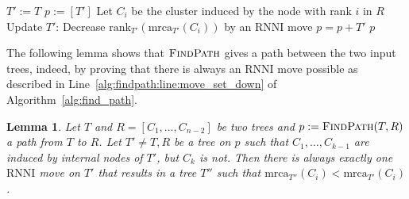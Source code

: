 \documentclass{amsart}
\newcommand{\mrca}{\mathrm{mrca}}
\newcommand{\rank}{\mathrm{rank}}
\newcommand{\rnni}{\mathrm{RNNI}}
\newcommand{\findpath}{\textsc{FindPath}}
\newtheorem{lemma}[definition]{Lemma}
\begin{document}
\begin{algorithm}[H]
\caption{$\findpath$($T,R$)}
\label{alg:find_path}
\begin{algorithmic}[1]
	\STATE $T' := T$
	\STATE $p := [T']$
		\STATE Let $C_i$ be the cluster induced by the node with rank $i$ in $R$ \label{alg:find_path:line:cluster}
		\WHILE {$\rank_{T'}(\mrca_{T'}(C_i))>i$}
			\STATE Update $T'$: Decrease $\rank_{T'}(\mrca_{T'}(C_i))$ by an $\rnni$ move \label{alg:findpath:line:move_set_down}
			\STATE $p = p+T'$
		\ENDWHILE
	\ENDFOR
	\RETURN $p$
\end{algorithmic}
\end{algorithm}

The following lemma shows that $\findpath$ gives a path between the two input trees, indeed, by proving that there is always an $\rnni$ move possible as described in Line~\ref{alg:findpath:line:move_set_down} of Algorithm~\ref{alg:find_path}.

\begin{lemma}
    Let $T$ and $R = [C_1, \ldots, C_{n-2}]$ be two trees and $p:= \findpath (T,R)$ a path from $T$ to $R$.
    Let $T' \neq T,R$ be a tree on $p$ such that $C_1, \ldots, C_{k-1}$ are induced by internal nodes of $T'$, but $C_k$ is not.
    Then there is always exactly one $\rnni$ move on $T'$ that results in a tree $T''$ such that $\mrca_{T''}(C_i) < \mrca_{T'}(C_i)$.
    \label{lemma:mrca_move}
\end{lemma}
\end{document}
